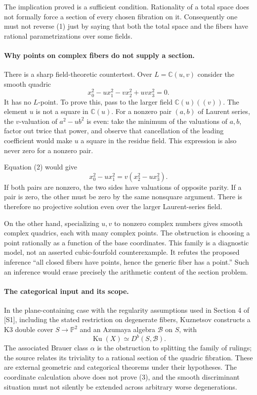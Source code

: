 \documentclass[11pt]{article}
\begin{document}
The implication proved is a sufficient condition. Rationality of a total space does not formally force a section of every chosen fibration on it. Consequently one must not reverse (1) just by saying that both the total space and the fibers have rational parametrizations over some fields.

\paragraph{Why points on complex fibers do not supply a section.}
There is a sharp field-theoretic countertest. Over $L=\mathbb C(u,v)$ consider the smooth quadric
\[
 x_0^2-u x_1^2-v x_2^2+uv x_3^2=0.                         \tag{2}
\]
It has no $L$-point. To prove this, pass to the larger field $\mathbb C(u)((v))$. The element $u$ is not a square in $\mathbb C(u)$. For a nonzero pair $(a,b)$ of Laurent series, the $v$-valuation of $a^2-u b^2$ is even: take the minimum of the valuations of $a,b$, factor out twice that power, and observe that cancellation of the leading coefficient would make $u$ a square in the residue field. This expression is also never zero for a nonzero pair.

Equation (2) would give
\[
 x_0^2-u x_1^2=v(x_2^2-u x_3^2).
\]
If both pairs are nonzero, the two sides have valuations of opposite parity. If a pair is zero, the other must be zero by the same nonsquare argument. There is therefore no projective solution even over the larger Laurent-series field.

On the other hand, specializing $u,v$ to nonzero complex numbers gives smooth complex quadrics, each with many complex points. The obstruction is choosing a point rationally as a function of the base coordinates. This family is a diagnostic model, not an asserted cubic-fourfold counterexample. It refutes the proposed inference ``all closed fibers have points, hence the generic fiber has a point.'' Such an inference would erase precisely the arithmetic content of the section problem.

\paragraph{The categorical input and its scope.}
In the plane-containing case with the regularity assumptions used in Section 4 of [S1], including the stated restriction on degenerate fibers, Kuznetsov constructs a K3 double cover $S\to\mathbb P^2$ and an Azumaya algebra $\mathcal B$ on $S$, with
\[
 \operatorname{Ku}(X)\simeq D^b(S,\mathcal B).              \tag{3}
\]
The associated Brauer class $\alpha$ is the obstruction to splitting the family of rulings; the source relates its triviality to a rational section of the quadric fibration. These are external geometric and categorical theorems under their hypotheses. The coordinate calculation above does not prove (3), and the smooth discriminant situation must not silently be extended across arbitrary worse degenerations.
\end{document}
